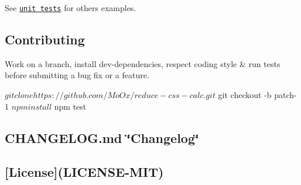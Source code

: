 See \href{test/index.js}{\tt unit tests} for others examples.

\subsection*{Contributing}

Work on a branch, install dev-\/dependencies, respect coding style \& run tests before submitting a bug fix or a feature.


\begin{DoxyCode}
$ git clone https://github.com/MoOx/reduce-css-calc.git
$ git checkout -b patch-1
$ npm install
$ npm test
\end{DoxyCode}


\subsection*{C\+H\+A\+N\+G\+E\+L\+O\+G.\+md \char`\"{}\+Changelog\char`\"{}}

\subsection*{\mbox{[}License\mbox{]}(L\+I\+C\+E\+N\+S\+E-\/\+M\+IT)}